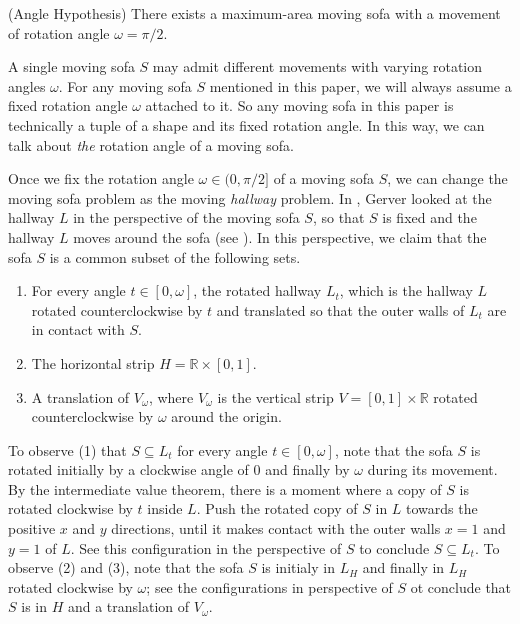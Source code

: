 \begin{conjecture}

(Angle Hypothesis) There exists a maximum-area moving sofa with a movement of rotation angle \(\omega = \pi/2\).

\label{con:angle}
\end{conjecture}

\begin{remark}

A single moving sofa \(S\) may admit different movements with varying rotation angles \(\omega\). For any moving sofa \(S\) mentioned in this paper, we will always assume a fixed rotation angle \(\omega\) attached to it. So any moving sofa in this paper is technically a tuple of a shape and its fixed rotation angle. In this way, we can talk about \emph{the} rotation angle of a moving sofa.

\label{rem:angle}
\end{remark}

Once we fix the rotation angle \(\omega \in (0, \pi/2]\) of a moving sofa \(S\), we can change the moving sofa problem as the moving \emph{hallway} problem. In \autocite{gerverMovingSofaCorner1992}, Gerver looked at the hallway \(L\) in the perspective of the moving sofa \(S\), so that \(S\) is fixed and the hallway \(L\) moves around the sofa (see ). In this perspective, we claim that the sofa \(S\) is a common subset of the following sets.

\begin{enumerate}
\def\labelenumi{\arabic{enumi}.}
\tightlist
\item
  For every angle \(t \in [0, \omega]\), the rotated hallway \(L_t\), which is the hallway \(L\) rotated counterclockwise by \(t\) and translated so that the outer walls of \(L_t\) are in contact with \(S\).
\item
  The horizontal strip \(H = \mathbb{R} \times [0, 1]\).
\item
  A translation of \(V_\omega\), where \(V_\omega\) is the vertical strip \(V = [0, 1] \times \mathbb{R}\) rotated counterclockwise by \(\omega\) around the origin.
\end{enumerate}

To observe (1) that \(S \subseteq L_t\) for every angle \(t \in [0, \omega]\), note that the sofa \(S\) is rotated initially by a clockwise angle of \(0\) and finally by \(\omega\) during its movement. By the intermediate value theorem, there is a moment where a copy of \(S\) is rotated clockwise by \(t\) inside \(L\). Push the rotated copy of \(S\) in \(L\) towards the positive \(x\) and \(y\) directions, until it makes contact with the outer walls \(x=1\) and \(y=1\) of \(L\). See this configuration in the perspective of \(S\) to conclude \(S \subseteq L_t\). To observe (2) and (3), note that the sofa \(S\) is initialy in \(L_H\) and finally in \(L_H\) rotated clockwise by \(\omega\); see the configurations in perspective of \(S\) ot conclude that \(S\) is in \(H\) and a translation of \(V_\omega\).

